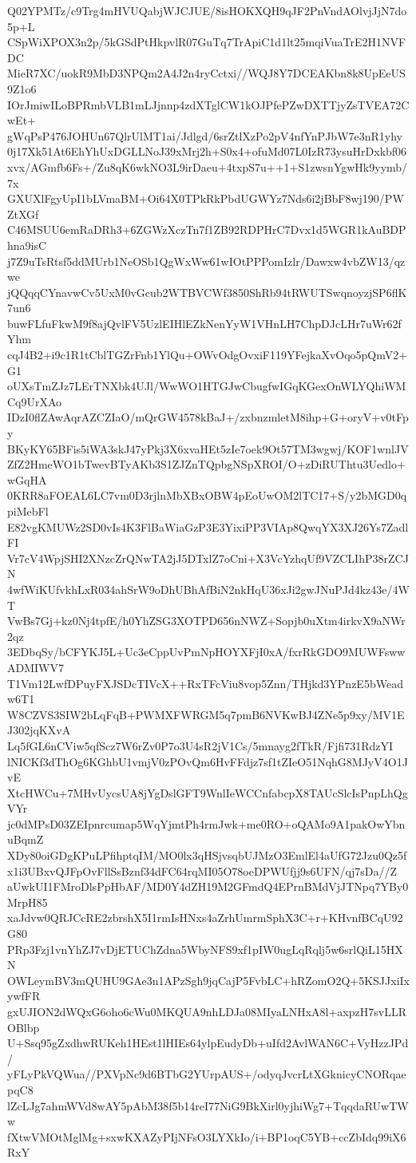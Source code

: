 Q02YPMTz/c9Trg4mHVUQabjWJCJUE/8isHOKXQH9qJF2PnVndAOlvjJjN7do5p+L
CSpWiXPOX3n2p/5kGSdPtHkpvlR07GuTq7TrApiC1d1lt25mqiVuaTrE2H1NVFDC
MieR7XC/uokR9MbD3NPQm2A4J2n4ryCctxi//WQJ8Y7DCEAKbn8k8UpEeUS9Z1o6
IOrJmiwILoBPRmbVLB1mLJjnnp4zdXTglCW1kOJPfePZwDXTTjyZsTVEA72CwEt+
gWqPsP476JOHUn67QlrUlMT1ai/Jdlgd/6srZtlXzPo2pV4nfYnPJbW7e3nR1yhy
0j17Xk51At6EhYhUxDGLLNoJ39xMrj2h+S0x4+ofuMd07L0IzR73ysuHrDxkbf06
xvx/AGmfb6Fs+/Zu8qK6wkNO3L9irDaeu+4txpS7u++1+S1zwsnYgwHk9yymb/7x
GXUXlFgyUpI1bLVmaBM+Oi64X0TPkRkPbdUGWYz7Nds6i2jBbF8wj190/PWZtXGf
C46MSUU6emRaDRh3+6ZGWzXczTn7f1ZB92RDPHrC7Dvx1d5WGR1kAuBDPhna9isC
j7Z9uTsRtsf5ddMUrb1NeOSb1QgWxWw61wIOtPPPomIzlr/Dawxw4vbZW13/qzwe
jQQqqCYnavwCv5UxM0vGcub2WTBVCWf3850ShRb94tRWUTSwqnoyzjSP6flK7un6
buwFLfuFkwM9f8ajQvlFV5UzlEIHlEZkNenYyW1VHnLH7ChpDJcLHr7uWr62fYhm
cqJ4B2+i9c1R1tCblTGZrFnb1YlQu+OWvOdgOvxiF119YFejkaXvOqo5pQmV2+G1
oUXsTmZJz7LErTNXbk4UJl/WwWO1HTGJwCbugfwIGqKGexOnWLYQhiWMCq9UrXAo
IDzI0flZAwAqrAZCZIaO/mQrGW4578kBaJ+/zxbnzmletM8ihp+G+oryV+v0tFpy
BKyKY65BFis5iWA3skJ47yPkj3X6xvaHEt5zIe7oek9Ot57TM3wgwj/KOF1wnlJV
ZfZ2HmeWO1bTwevBTyAKb3S1ZJZnTQpbgNSpXROI/O+zDiRUThtu3Uedlo+wGqHA
0KRR8aFOEAL6LC7vm0D3rjlnMbXBxOBW4pEoUwOM2lTC17+S/y2bMGD0qpiMebFl
E82vgKMUWz2SD0vIs4K3FlBaWiaGzP3E3YixiPP3VIAp8QwqYX3XJ26Ys7ZadlFI
Vr7cV4WpjSHI2XNzcZrQNwTA2jJ5DTxlZ7oCni+X3VcYzhqUf9VZCLIhP38rZCJN
4wfWiKUfvkhLxR034ahSrW9oDhUBhAfBiN2nkHqU36xJi2gwJNuPJd4kz43e/4WT
VwBs7Gj+kz0Nj4tpfE/h0YhZSG3XOTPD656nNWZ+Sopjb0uXtm4irkvX9aNWr2qz
3EDbqSy/bCFYKJ5L+Uc3eCppUvPmNpHOYXFjI0xA/fxrRkGDO9MUWFswwADMIWV7
T1Vm12LwfDPuyFXJSDcTIVcX++RxTFcViu8vop5Znn/THjkd3YPnzE5bWeadw6T1
W8CZVS3SIW2bLqFqB+PWMXFWRGM5q7pmB6NVKwBJ4ZNe5p9xy/MV1EJ302jqKXvA
Lq5fGL6nCViw5qfScz7W6rZv0P7o3U4sR2jV1Cs/5mnayg2fTkR/Fjfi731RdzYI
lNICKf3dThOg6KGhbU1vmjV0zPOvQm6HvFFdjz7sf1tZIeO51NqhG8MJyV4O1JvE
XtcHWCu+7MHvUycsUA8jYgDslGFT9WnlIeWCCnfabcpX8TAUcSlcIsPnpLhQgVYr
jc0dMPsD03ZEIpnrcumap5WqYjmtPh4rmJwk+me0RO+oQAMo9A1pakOwYbnuBqmZ
XDy80oiGDgKPuLPfihptqIM/MO0lx3qHSjvsqbUJMzO3EmlEl4aUfG72Jzu0Qz5f
x1i3UBxvQJFpOvFllSsBznf34dFC64rqMI05O78oeDPWUfjj9s6UFN/qj7sDa//Z
aUwkUI1FMroDlsPpHbAF/MD0Y4dZH19M2GFmdQ4EPrnBMdVjJTNpq7YBy0MrpH85
xaJdvw0QRJCcRE2zbrshX5I1rmIsHNxs4aZrhUmrmSphX3C+r+KHvnfBCqU92G80
PRp3Fzj1vnYhZJ7vDjETUChZdna5WbyNFS9xf1pIW0ugLqRqlj5w6srlQiL15HXN
OWLeymBV3mQUHU9GAe3n1APzSgh9jqCajP5FvbLC+hRZomO2Q+5KSJJxiIxywfFR
gxUJION2dWQxG6oho6cWu0MKQUA9nhLDJa08MIyaLNHxA8l+axpzH7svLLROBlbp
U+Ssq95gZxdhwRUKeh1HEst1lHIEs64ylpEudyDb+uIfd2AvlWAN6C+VyHzzJPd/
yFLyPkVQWua//PXVpNc9d6BTbG2YUrpAUS+/odyqJvcrLtXGknicyCNORqaepqC8
lZcLJg7ahmWVd8wAY5pAbM38f5b14reI77NiG9BkXirl0yjhiWg7+TqqdaRUwTWw
fXtwVMOtMglMg+sxwKXAZyPIjNFsO3LYXkIo/i+BP1oqC5YB+ccZbIdq99iX6RxY
